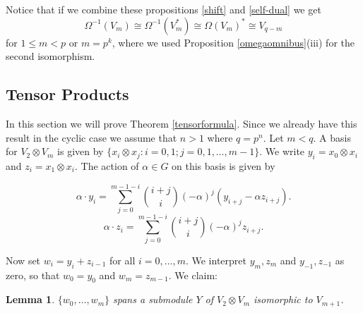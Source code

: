 \documentclass[a4paper]{amsart}
\newtheorem{Lemma}{Lemma}[section]
\theoremstyle{definition}
\theoremstyle{remark}
\theoremstyle{Acknowledgments}
\begin{document}
Notice that if we combine these propositions \ref{shift} and \ref{self-dual} we get
\[\Omega^{-1}(V_m) \cong \Omega^{-1}(V_m^*) \cong \Omega(V_m)^* \cong V_{q-m} \] for $1 \leq m<p$ or $m=p^k$, where we used Proposition \ref{omegaomnibus}(iii) for the second isomorphism.


\subsection{Tensor Products}
In this section we will prove Theorem \ref{tensorformula}. Since we already have this result in the cyclic case we assume that $n>1$ where $q=p^n$. Let $m<q$. A basis for $V_2 \otimes V_m$ is given by $\{x_i \otimes x_j: i=0,1; j=0,1, \ldots, m-1\}$. We write $y_i = x_0 \otimes x_i$ and $z_i = x_1 \otimes x_i$. The action of $\alpha \in G$ on this basis is given by

\begin{equation}
 \alpha \cdot y_i  = \sum_{j=0}^{m-1-i}\binom{i+j}{i}(-\alpha)^j (y_{i+j} - \alpha z_{i+j}).
\end{equation}
\begin{equation}
 \alpha \cdot z_i  = \sum_{j=0}^{m-1-i}\binom{i+j}{i}(-\alpha)^j z_{i+j}.
\end{equation}

Now set $w_i = y_i+z_{i-1}$ for all $i=0, \ldots, m$. We interpret $y_m, z_m$ and $y_{-1},z_{-1}$ as zero, so that $w_0 = y_0$ and $w_m = z_{m-1}$. We claim:

\begin{Lemma}
$\{w_0, \ldots, w_m\}$ spans a submodule $Y$ of $V_2 \otimes V_m$ isomorphic to $V_{m+1}$.
\end{Lemma}
\end{document}
